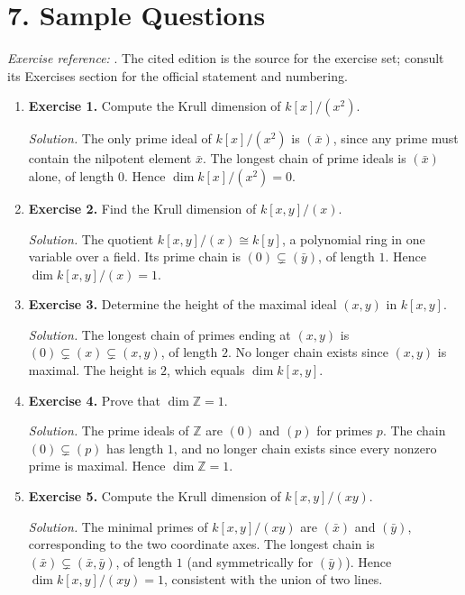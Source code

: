 \section*{7. Sample Questions}
\emph{Exercise reference:} \cite{dimension_theory_ref1}. The cited edition is the source for the exercise set; consult its Exercises section for the official statement and numbering.
\begin{enumerate}[leftmargin=*,itemsep=0.9em]

\item \textbf{Exercise 1.} Compute the Krull dimension of $k[x]/(x^2)$.

\emph{Solution.} The only prime ideal of $k[x]/(x^2)$ is $(\bar{x})$, since any prime must contain the nilpotent element $\bar{x}$. The longest chain of prime ideals is $(\bar{x})$ alone, of length $0$. Hence $\dim k[x]/(x^2)=0$.

\item \textbf{Exercise 2.} Find the Krull dimension of $k[x,y]/(x)$.

\emph{Solution.} The quotient $k[x,y]/(x)\cong k[y]$, a polynomial ring in one variable over a field. Its prime chain is $(0)\subsetneq(\bar{y})$, of length $1$. Hence $\dim k[x,y]/(x)=1$.

\item \textbf{Exercise 3.} Determine the height of the maximal ideal $(x,y)$ in $k[x,y]$.

\emph{Solution.} The longest chain of primes ending at $(x,y)$ is $(0)\subsetneq(x)\subsetneq(x,y)$, of length $2$. No longer chain exists since $(x,y)$ is maximal. The height is $2$, which equals $\dim k[x,y]$.

\item \textbf{Exercise 4.} Prove that $\dim\mathbb Z=1$.

\emph{Solution.} The prime ideals of $\mathbb Z$ are $(0)$ and $(p)$ for primes $p$. The chain $(0)\subsetneq(p)$ has length $1$, and no longer chain exists since every nonzero prime is maximal. Hence $\dim\mathbb Z=1$.

\item \textbf{Exercise 5.} Compute the Krull dimension of $k[x,y]/(xy)$.

\emph{Solution.} The minimal primes of $k[x,y]/(xy)$ are $(\bar{x})$ and $(\bar{y})$, corresponding to the two coordinate axes. The longest chain is $(\bar{x})\subsetneq(\bar{x},\bar{y})$, of length $1$ (and symmetrically for $(\bar{y})$). Hence $\dim k[x,y]/(xy)=1$, consistent with the union of two lines.

\end{enumerate}
